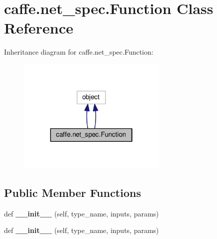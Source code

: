 \hypertarget{classcaffe_1_1net__spec_1_1_function}{}\section{caffe.\+net\+\_\+spec.\+Function Class Reference}
\label{classcaffe_1_1net__spec_1_1_function}


Inheritance diagram for caffe.\+net\+\_\+spec.\+Function\+:
\nopagebreak
\begin{figure}[H]
\begin{center}
\leavevmode
\includegraphics[width=202pt]{classcaffe_1_1net__spec_1_1_function__inherit__graph}
\end{center}
\end{figure}
\subsection*{Public Member Functions}
\begin{DoxyCompactItemize}
\item 
\mbox{\label{classcaffe_1_1net__spec_1_1_function_ae5d40ad234c2b002c52e89c2880c395b}} 
def {\bfseries \+\_\+\+\_\+init\+\_\+\+\_\+} (self, type\+\_\+name, inputs, params)
\item 
\mbox{\label{classcaffe_1_1net__spec_1_1_function_ae5d40ad234c2b002c52e89c2880c395b}} 
def {\bfseries \+\_\+\+\_\+init\+\_\+\+\_\+} (self, type\+\_\+name, inputs, params)
\end{DoxyCompactItemize}
